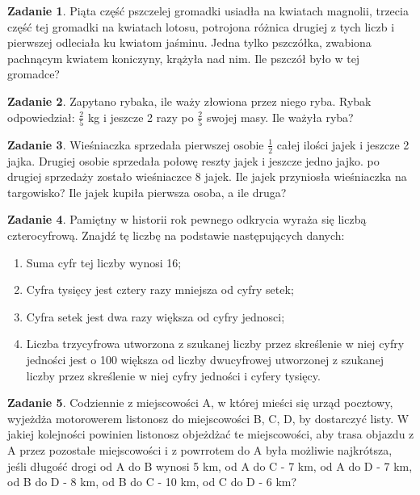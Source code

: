 \documentclass[11pt]{article}
\theoremstyle{definition}
\newtheorem{zad}{Zadanie}
\begin{document}
\begin{zad}
Piąta część pszczelej gromadki usiadła na kwiatach magnolii, trzecia część tej gromadki na kwiatach lotosu, potrojona różnica drugiej z tych liczb i pierwszej odleciała ku kwiatom jaśminu. Jedna tylko pszczółka, zwabiona pachnącym kwiatem koniczyny, krążyła nad nim. Ile pszczół było w tej gromadce?
\end{zad}

\begin{zad}
Zapytano rybaka, ile waży złowiona przez niego ryba. Rybak odpowiedział: $\frac25$ kg i jeszcze 2 razy po $\frac25$ swojej masy. Ile ważyła ryba?
\end{zad}

\begin{zad}
Wieśniaczka sprzedała pierwszej osobie $\frac12$ całej ilości jajek i jeszcze 2 jajka. Drugiej osobie sprzedała połowę reszty jajek i jeszcze jedno jajko. po drugiej sprzedaży zostało wieśniaczce 8 jajek. Ile jajek przyniosła wieśniaczka na targowisko? Ile jajek kupiła pierwsza osoba, a ile druga?
\end{zad}

\begin{zad}
Pamiętny w historii rok pewnego odkrycia wyraża się liczbą czterocyfrową. Znajdź tę liczbę na podstawie następujących danych:
\begin{enumerate}
\item Suma cyfr tej liczby wynosi 16;
\item Cyfra tysięcy jest cztery razy mniejsza od cyfry setek;
\item Cyfra setek jest dwa razy większa od cyfry jednosci;
\item Liczba trzycyfrowa utworzona z szukanej liczby przez skreślenie w niej cyfry jedności jest o 100 większa od liczby dwucyfrowej utworzonej z szukanej liczby przez skreślenie w niej cyfry jedności i cyfery tysięcy.
\end{enumerate}
\end{zad}

\begin{zad}
Codziennie z miejscowości A, w której mieści się urząd pocztowy, wyjeżdża motorowerem listonosz do miejscowości B, C, D, by dostarczyć listy. W jakiej kolejności powinien listonosz objeżdżać te miejscowości, aby trasa objazdu z A przez pozostałe miejscowości i z powrrotem do A była możliwie najkrótsza, jeśli długość drogi od A do B wynosi 5 km, od A do C - 7 km, od A do D - 7 km, od B do D - 8 km, od B do C - 10 km, od C do D - 6 km?
\end{zad}
\end{document}
